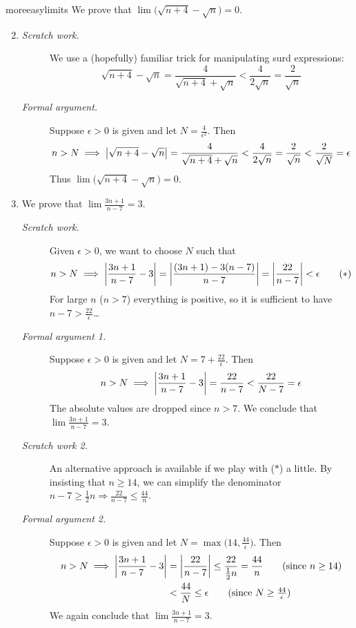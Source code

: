 \begin{examples}{}{moreeasylimits}
	\exstart We prove that $\lim \bigl(\sqrt{n+4}-\sqrt n\bigr) =0$.
	\begin{enumerate}\setcounter{enumi}{1}
		\item[]\begin{description}
			\item[\normalfont\emph{Scratch work.}] We use a (hopefully) familiar trick for manipulating surd expressions:
			\[
				\sqrt{n+4}-\sqrt n=\frac 4{\sqrt{n+4}+\sqrt n} 
				<\frac 4{2\sqrt n}=\frac 2{\sqrt n}
			\]
		
			\item[\normalfont\emph{Formal argument.}] Suppose $\epsilon>0$ is given and let $N=\frac 4{\epsilon^2}$. Then
			\[
				n>N\implies \left| \sqrt{n+4}-\sqrt n\right|=\frac 4{\sqrt{n+4}+\sqrt n} 
				<\frac 4{2\sqrt n}=\frac 2{\sqrt n}
				<\frac 2{\sqrt N}=\epsilon
			\]
			Thus $\lim\bigl(\sqrt{n+4}-\sqrt n\bigr) =0$.
		\end{description}
		
		
		\goodbreak
		

		\item\label{ex:ep2} We prove that $\lim\frac{3n+1}{n-7}=3$.
		\begin{description}
			\item[\normalfont\emph{Scratch work.}] Given $\epsilon>0$, we want to choose $N$ such that
			\[
				n>N\implies \left| \frac{3n+1}{n-7}-3\right|
				=\left| \frac{(3n+1)-3(n-7)}{n-7}\right|
				=\left| \frac{22}{n-7}\right|<\epsilon \tag{$\ast$}
			\]
			For large $n$ ($n>7$) everything is positive, so it is sufficient to have $n-7>\frac{22}\epsilon$\ldots
			
			\item[\normalfont\emph{Formal argument 1.}] Suppose $\epsilon>0$ is given and let $N=7+\frac{22}{\epsilon}$. Then
			\[
				n>N\implies \left| \frac{3n+1}{n-7}-3\right| =\frac{22}{n-7} <\frac{22}{N-7}=\epsilon
			\]
			The absolute values are dropped since $n>7$. We conclude that $\lim\frac{3n+1}{n-7}=3$.
		
			\item[\normalfont\emph{Scratch work 2.}] An alternative approach is available if we play with ($\ast$) a little. By insisting that $n\ge 14$, we can simplify the denominator $n-7\ge \frac 12n\Longrightarrow \frac{22}{n-7}\le \frac{44}n$.
		
			\item[\normalfont\emph{Formal argument 2.}] Suppose $\epsilon>0$ is given and let $N=\max\bigl(14,\frac{44}{\epsilon}\bigr)$. Then
			\begin{align*}
				n>N\implies \nm{\frac{3n+1}{n-7}-3}&=\nm{\frac{22}{n-7}}\le\frac{22}{\frac 12n} =\frac{44}n \tag{since $n\ge 14$}\\
				&<\frac{44}N \le\epsilon\tag*{(since $N\ge \frac{44}\epsilon$)}
			\end{align*}
			We again conclude that $\lim\frac{3n+1}{n-7}=3$.
		\end{description}
		

\end{enumerate}
\end{examples}
